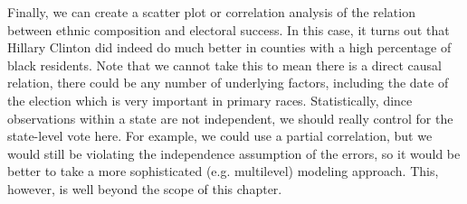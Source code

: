 Finally, we can create a scatter plot or correlation analysis of the relation between ethnic composition and electoral success.
In this case, it turns out that Hillary Clinton did indeed do much better in counties with a high percentage of black residents.
Note that we cannot take this to mean there is a direct causal relation, there could be any number of underlying factors, including the date of the election which is very important in primary races.
Statistically, dince observations within a state are not independent, we should really control for the state-level vote here.
For example, we could use a partial correlation, but we would still be violating the independence assumption of the errors,
so it would be better to take a more sophisticated (e.g. multilevel) modeling approach. This, however, is well beyond the scope
of this chapter. 

